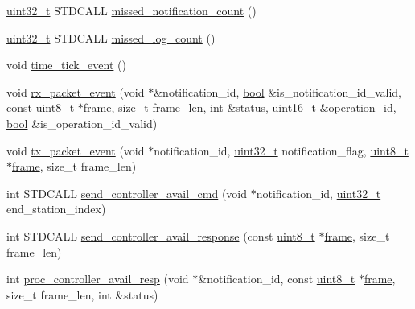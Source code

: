 \begin{DoxyCompactItemize}
\item 
\hyperlink{parse_8c_a6eb1e68cc391dd753bc8ce896dbb8315}{uint32\+\_\+t} S\+T\+D\+C\+A\+LL \hyperlink{classavdecc__lib_1_1controller__imp_a83145d4367ada9f4f9389d95b4267589}{missed\+\_\+notification\+\_\+count} ()
\item 
\hyperlink{parse_8c_a6eb1e68cc391dd753bc8ce896dbb8315}{uint32\+\_\+t} S\+T\+D\+C\+A\+LL \hyperlink{classavdecc__lib_1_1controller__imp_a082e0a561ef6c8fff74d25ef5cbb42af}{missed\+\_\+log\+\_\+count} ()
\item 
void \hyperlink{classavdecc__lib_1_1controller__imp_a3bd2381fee8ed2f308397b2b0433931e}{time\+\_\+tick\+\_\+event} ()
\item 
void \hyperlink{classavdecc__lib_1_1controller__imp_abc210704762ea3b2cba8422543d3ce44}{rx\+\_\+packet\+\_\+event} (void $\ast$\&notification\+\_\+id, \hyperlink{avb__gptp_8h_af6a258d8f3ee5206d682d799316314b1}{bool} \&is\+\_\+notification\+\_\+id\+\_\+valid, const \hyperlink{stdint_8h_aba7bc1797add20fe3efdf37ced1182c5}{uint8\+\_\+t} $\ast$\hyperlink{gst__avb__playbin_8c_ac8e710e0b5e994c0545d75d69868c6f0}{frame}, size\+\_\+t frame\+\_\+len, int \&status, uint16\+\_\+t \&operation\+\_\+id, \hyperlink{avb__gptp_8h_af6a258d8f3ee5206d682d799316314b1}{bool} \&is\+\_\+operation\+\_\+id\+\_\+valid)
\item 
void \hyperlink{classavdecc__lib_1_1controller__imp_a925e4ecb60a5e6afb6b8f99997ed0f35}{tx\+\_\+packet\+\_\+event} (void $\ast$notification\+\_\+id, \hyperlink{parse_8c_a6eb1e68cc391dd753bc8ce896dbb8315}{uint32\+\_\+t} notification\+\_\+flag, \hyperlink{stdint_8h_aba7bc1797add20fe3efdf37ced1182c5}{uint8\+\_\+t} $\ast$\hyperlink{gst__avb__playbin_8c_ac8e710e0b5e994c0545d75d69868c6f0}{frame}, size\+\_\+t frame\+\_\+len)
\item 
int S\+T\+D\+C\+A\+LL \hyperlink{classavdecc__lib_1_1controller__imp_a34b93dde684ee7a1af69bf45c12272ef}{send\+\_\+controller\+\_\+avail\+\_\+cmd} (void $\ast$notification\+\_\+id, \hyperlink{parse_8c_a6eb1e68cc391dd753bc8ce896dbb8315}{uint32\+\_\+t} end\+\_\+station\+\_\+index)
\item 
int S\+T\+D\+C\+A\+LL \hyperlink{classavdecc__lib_1_1controller__imp_ab0133295fa2700fa61a18663628a5328}{send\+\_\+controller\+\_\+avail\+\_\+response} (const \hyperlink{stdint_8h_aba7bc1797add20fe3efdf37ced1182c5}{uint8\+\_\+t} $\ast$\hyperlink{gst__avb__playbin_8c_ac8e710e0b5e994c0545d75d69868c6f0}{frame}, size\+\_\+t frame\+\_\+len)
\item 
int \hyperlink{classavdecc__lib_1_1controller__imp_a80e6b7cd83ce663e61251035d0c94fe5}{proc\+\_\+controller\+\_\+avail\+\_\+resp} (void $\ast$\&notification\+\_\+id, const \hyperlink{stdint_8h_aba7bc1797add20fe3efdf37ced1182c5}{uint8\+\_\+t} $\ast$\hyperlink{gst__avb__playbin_8c_ac8e710e0b5e994c0545d75d69868c6f0}{frame}, size\+\_\+t frame\+\_\+len, int \&status)
\end{DoxyCompactItemize}
